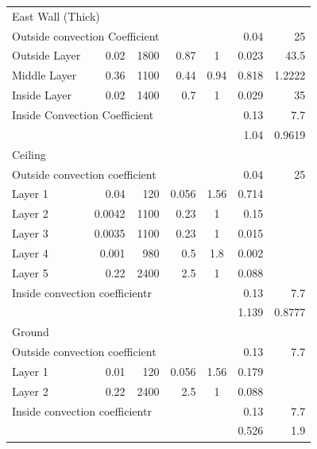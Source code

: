 \documentclass[a4paper, oneside]{discothesis}
\begin{document}
\begin{table}[h!]
\begin{tabular}{lrrrcrr}
			    \midrule
			    \multicolumn{7}{p{26.86em}}{East Wall (Thick)} \\
			    \multicolumn{3}{p{13.93em}}{Outside convection Coefficient} &      &      & 0.04 & 25 \\
			    \multicolumn{1}{p{6.785em}}{Outside Layer} & 0.02 & 1800 & 0.87 & 1    & 0.023 & 43.5 \\
			    \multicolumn{1}{p{6.785em}}{Middle Layer} & 0.36 & 1100 & 0.44 & 0.94 & 0.818 & 1.2222 \\
			    \multicolumn{1}{p{6.785em}}{Inside Layer} & 0.02 & 1400 & 0.7  & 1    & 0.029 & 35 \\
			    \multicolumn{3}{p{13.93em}}{Inside Convection Coefficient} &      &      & 0.13 & 7.7 \\
			         &      &      &      &      & 1.04 & 0.9619 \\
			    \midrule
			    \multicolumn{7}{p{26.86em}}{Ceiling} \\
			    \multicolumn{3}{p{13.93em}}{Outside convection coefficient} &      &      & 0.04 & 25 \\
			    \multicolumn{1}{p{6.785em}}{Layer 1} & 0.04 & 120  & 0.056 & 1.56 & 0.714 &  \\
			    \multicolumn{1}{p{6.785em}}{Layer 2} & 0.0042 & 1100 & 0.23 & 1    & 0.15 &  \\
			    \multicolumn{1}{p{6.785em}}{Layer 3} & 0.0035 & 1100 & 0.23 & 1    & 0.015 &  \\
			    \multicolumn{1}{p{6.785em}}{Layer 4} & 0.001 & 980  & 0.5  & 1.8  & 0.002 &  \\
			    \multicolumn{1}{p{6.785em}}{Layer 5} & 0.22 & 2400 & 2.5  & 1    & 0.088 &  \\
			    \multicolumn{3}{p{13.93em}}{Inside convection coefficientr} &      &      & 0.13 & 7.7 \\
			         &      &      &      &      & 1.139 & 0.8777 \\
			    \midrule
			    \multicolumn{7}{p{26.86em}}{Ground} \\
			    \multicolumn{3}{p{13.93em}}{Outside convection coefficient} &      &      & 0.13 & 7.7 \\
			    \multicolumn{1}{p{6.785em}}{Layer 1} & 0.01 & 120  & 0.056 & 1.56 & 0.179 &  \\
			    \multicolumn{1}{p{6.785em}}{Layer 2} & 0.22 & 2400 & 2.5  & 1    & 0.088 &  \\
			    \multicolumn{3}{p{13.93em}}{Inside convection coefficientr} &      &      & 0.13 & 7.7 \\
			         &      &      &      &      & 0.526 & 1.9 \\
			    \bottomrule
			    \end{tabular}%
			  \label{tab:SumatraWallMaterial}%
			\end{table}%
\end{document}
